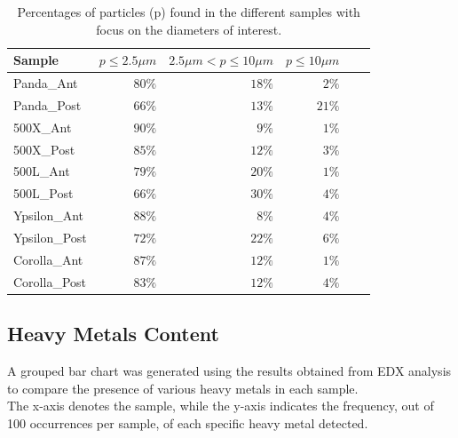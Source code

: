 \begin{table}[h]
\centering

\begin{tabular}{l r r r r r}
\hline

Sample & $p \leq 2.5 \mu m$ & $ 2.5 \mu m < p \leq 10 \mu m$ & $p \leq 10 \mu m$ \\

\hline

Panda\_Ant & $80\%$ & $18\%$ & $2\%$ \\
Panda\_Post & $66\%$ & $13\%$ & $21\%$ \\
500X\_Ant & $90\%$ & $9\%$ & $1\%$ \\
500X\_Post & $85\%$ & $12\%$ & $3\%$ \\
500L\_Ant & $79\%$ & $20\%$ & $1\%$ \\
500L\_Post & $66\%$ & $30\%$ & $4\%$ \\
Ypsilon\_Ant & $88\%$ & $8\%$ & $4\%$ \\
Ypsilon\_Post & $72\%$ & $22\%$ & $6\%$ \\
Corolla\_Ant & $87\%$ & $12\%$ & $1\%$ \\
Corolla\_Post & $83\%$ & $12\%$ & $4\%$ \\

        \hline

    \end{tabular}
     \caption{Percentages of particles (p) found in the different samples with focus on the diameters of interest. }
     \label{tab:percentages}
\end{table}

\subsection{Heavy Metals Content}

A grouped bar chart was generated using the results obtained from EDX analysis to compare the presence of various heavy metals in each sample. \\
The x-axis denotes the sample, while the y-axis indicates the frequency, out of 100 occurrences per sample, of each specific heavy metal detected.


